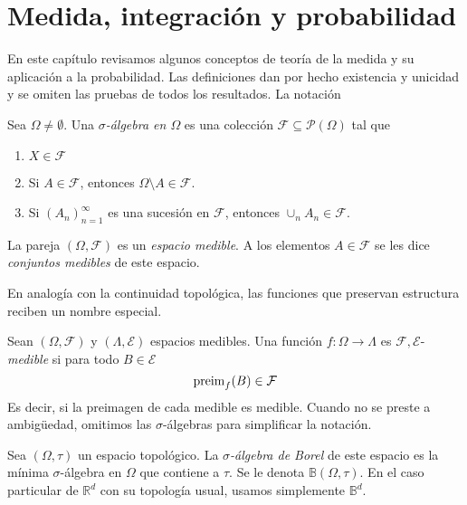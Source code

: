 \documentclass[main.tex]{subfiles}
\begin{document}
\chapter{Medida, integración y probabilidad}
En este capítulo revisamos algunos conceptos de teoría de la medida y su aplicación a la probabilidad. Las definiciones dan por hecho existencia y unicidad y se omiten las pruebas de todos los resultados. La notación 

\begin{definition}
Sea $\Omega\neq\emptyset$. Una \textit{$\sigma$-álgebra en $\Omega$} es una colección $\mathcal{F}\subseteq\mathcal{P}(\Omega)$ tal que
\begin{enumerate}[label=\roman*.]
	\item $X \in \mathcal{F}$
	\item Si $A\in\mathcal{F}$, entonces $\Omega\setminus A \in \mathcal{F}$.
	\item Si $(A_n)_{n=1}^\infty$ es una sucesión en $\mathcal{F}$, entonces $\cup_nA_n\in \mathcal{F}$.
\end{enumerate}
La pareja $(\Omega, \mathcal{F})$ es un \textit{espacio medible}. A los elementos $A\in\mathcal{F}$ se les dice \textit{conjuntos medibles} de este espacio.
\end{definition}


En analogía con la continuidad topológica, las funciones que preservan estructura reciben un nombre especial.

\begin{definition}
Sean $(\Omega, \mathcal{F})$ y $(\Lambda, \mathcal{E})$ espacios medibles. Una función $f: \Omega \to \Lambda$ es $\mathcal{F,E}$-\textit{medible} si para todo $B\in\mathcal{E}$
\begin{equation*}
\operatorname{preim}_f(B)\in\mathcal{F}	
\end{equation*}
Es decir, si la preimagen de cada medible es medible. Cuando no se preste a ambigüedad, omitimos las $\sigma$-álgebras para simplificar la notación.
\end{definition}

\begin{definition}
Sea $(\Omega, \tau)$ un espacio topológico. La $\sigma$\textit{-álgebra de Borel} de este espacio es la mínima $\sigma$-álgebra en $\Omega$ que contiene a $\tau$. Se le denota $\mathbb{B}(\Omega, \tau)$.
En el caso particular de $\mathbb{R}^d$ con su topología usual, usamos simplemente $\mathbb{B}^d$.
\end{definition}
\end{document}
